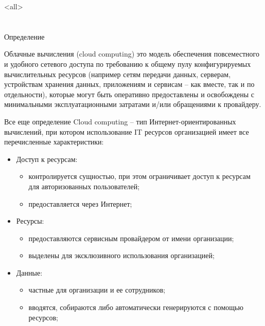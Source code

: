 

\subtitle{Облачные\\вычисления}



\mode<all>{}

%
%
\section{}

\begin{frame}{Определение}
	\begin{block}{Облачные вычисления (cloud computing)}
это модель обеспечения повсеместного и удобного сетевого доступа по требованию к общему пулу 
конфигурируемых вычислительных ресурсов (например сетям передачи данных,  серверам,  
устройствам хранения данных,  приложениям и сервисам -- как вместе,  так и по отдельности),  
которые могут быть оперативно предоставлены и освобождены с минимальными эксплуатационными 
затратами и/или обращениями к провайдеру.
	\end{block}
\end{frame}


\begin{frame}{Все еще определение}
Cloud computing -- тип Интернет-ориентированных вычислений, при котором использование IT ресурсов организацией имеет все перечисленные характеристики:

	\begin{itemize}
		\item Доступ к ресурсам:
		\begin{itemize}
			\item контролируется сущностью, при этом  ограничивает доступ к ресурсам для авторизованных пользователей;
			\item предоставляется через Интернет;
		\end{itemize}

	\item Ресурсы:
		\begin{itemize}
			\item предоставляются сервисным провайдером от имени организации;
			\item выделены для эксклюзивного использования организацией;
		\end{itemize}
	\item Данные:
		\begin{itemize}
			\item частные для организации и ее сотрудников;
			\item вводятся, собираются либо автоматически генерируются с помощью ресурсов;
		\end{itemize}
	\end{itemize}

\end{frame}

